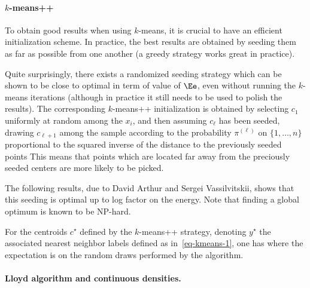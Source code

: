 \paragraph{$k$-means++}

To obtain good results when using $k$-means, it is crucial to have an efficient initialization scheme. In practice, the best results are obtained by seeding them as far as possible from one another (a greedy strategy works great in practice). 

Quite surprisingly, there exists a randomized seeding strategy which can be shown to be close to optimal in term of value of $\Ee$, even without running the $k$-means iterations (although in practice it still needs to be used to polish the results). The corresponding $k$-means++ initialization is obtained by selecting $c_1$ uniformly at random among the $x_{i}$, and then assuming $c_\ell$ has been seeded, drawing $c_{\ell+1}$ among the sample according to the probability $\pi^{(\ell)}$ on $\{1,\ldots,n\}$ proportional to the squared inverse of the distance to the previously seeded points
This means that points which are located far away from the preciously seeded centers are more likely to be picked. 

The following results, due to David Arthur and Sergei Vassilvitskii, shows that this seeding is optimal up to log factor on the energy. Note that finding a global optimum is known to be NP-hard.

\begin{thm}
	For the centroids $c^\star$ defined by the $k$-means++ strategy, denoting $y^\star$ the associated nearest neighbor labels defined as in~\eqref{eq-kmeans-1}, one has
	where the expectation is on the random draws performed by the algorithm.
\end{thm}




\paragraph{Lloyd algorithm and continuous densities.}

